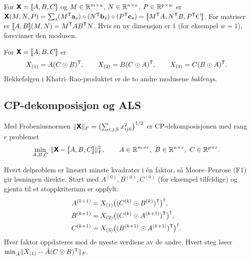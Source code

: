 \begin{defn}
For $\bm{\mathsf{X}}=[\![ A,B,C ]\!]$ og $M\in\mathbb{R}^{m\times u}$, $N\in\mathbb{R}^{n\times v}$, $P\in\mathbb{R}^{p\times w}$ er $\bm{\mathsf{X}}(M,N,P)=\sum_s(M^{\mathsf{T}}\mathbf{a}_s)\circ(N^{\mathsf{T}}\mathbf{b}_s)\circ(P^{\mathsf{T}}\mathbf{c}_s)=[\![ M^{\mathsf{T}} A,N^{\mathsf{T}} B,P^{\mathsf{T}} C ]\!]$. For matriser er $[\![ A,B ]\!](M,N)=M^{\mathsf{T}} AB^{\mathsf{T}} N$. Hvis en ny dimensjon er 1 (for eksempel $w=1$), forsvinner den modusen.
\end{defn}

\begin{teorem}
For $\bm{\mathsf{X}}=[\![ A,B,C ]\!]$ er
\[
X_{(1)}=A(C\odot B)^{\mathsf{T}},\qquad X_{(2)}=B(C\odot A)^{\mathsf{T}},\qquad X_{(3)}=C(B\odot A)^{\mathsf{T}} .
\]
Rekkefølgen i Khatri--Rao-produktet er de to andre modusene \emph{baklengs}.
\end{teorem}

\subsection{CP-dekomposisjon og ALS}
\begin{defn}
Med Frobeniusnormen $\lVert \bm{\mathsf{X}}\rVert_F=\bigl(\sum_{i,j,k}x_{ijk}^2\bigr)^{1/2}$ er CP-dekomposisjonen med rang $r$ problemet
\[
\min_{A,B,C}\ \norm{\tn X-\kr{A,B,C}}_F^2,\qquad A\in\R^{m\times r},\ B\in\R^{n\times r},\ C\in\R^{p\times r}.
\]
\end{defn}
\begin{oppskrift}
Hvert delproblem er lineært minste kvadrater i én faktor, så Moore--Penrose (F1) gir løsningen direkte. Start med $A^{(0)},B^{(0)},C^{(0)}$ (for eksempel tilfeldige) og gjenta til et stoppkriterium er oppfylt:
\begin{align*}
A^{(k+1)}&=X_{(1)}\bigl((C^{(k)}\odot B^{(k)})^{\mathsf{T}}\bigr)^\dagger,\\
B^{(k+1)}&=X_{(2)}\bigl((C^{(k)}\odot A^{(k+1)})^{\mathsf{T}}\bigr)^\dagger,\\
C^{(k+1)}&=X_{(3)}\bigl((B^{(k+1)}\odot A^{(k+1)})^{\mathsf{T}}\bigr)^\dagger.
\end{align*}
Hver faktor oppdateres med de nyeste verdiene av de andre. Hvert steg løser $\min_{\tilde A}\lVert X_{(1)}-\tilde A(C\odot B)^{\mathsf{T}}\rVert_F$.
\end{oppskrift}

